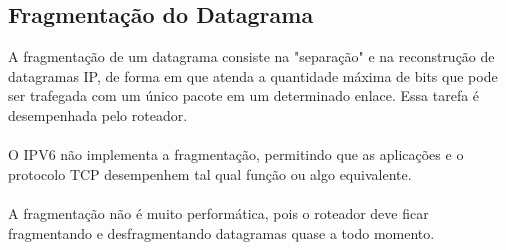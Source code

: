 \documentclass[a4paper, 12pt]{article}
\begin{document}
    \subsection{Fragmentação do Datagrama}
    A fragmentação de um datagrama consiste na "separação" e na reconstrução de datagramas IP, de forma em que atenda a quantidade
    máxima de bits que pode ser trafegada com um único pacote em um determinado enlace. Essa tarefa é desempenhada pelo roteador.
    \\\\
    O IPV6 não implementa a fragmentação, permitindo que as aplicações e o protocolo TCP desempenhem tal qual função ou algo equivalente.
    \\\\
    A fragmentação não é muito performática, pois o roteador deve ficar fragmentando e desfragmentando datagramas quase a todo 
    momento.
\end{document}
